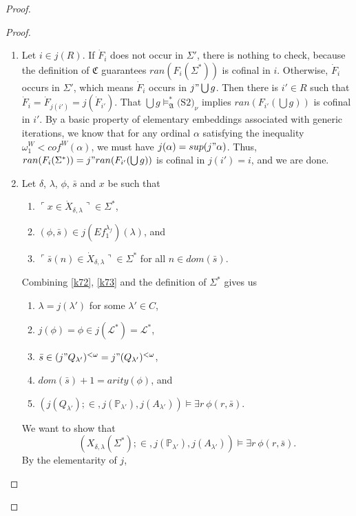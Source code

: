 \documentclass[12pt]{article}
\numberwithin{equation}{section}
\begin{document}
\begin{proof}
\begin{proof}
\begin{enumerate}[label=<$k$> $\eq$ \arabic* :, leftmargin=70pt]
    \addtocounter{enumi}{1}
    \item Let $i \in j(R)$. If $\dot{F}_i$ does not occur in $\Sigma'$, there is nothing to check, because the definition of $\mathfrak{C}$ guarantees $ran(F_i(\Sigma^*))$ is cofinal in $i$. Otherwise, $\dot{F}_i$ occurs in $\Sigma'$, which means $\dot{F}_i$ occurs in $j" \bigcup g$. Then there is $i' \in R$ such that $\dot{F}_i = \dot{F}_{j(i')} = j(\dot{F}_{i'})$. That $\bigcup g \models^*_{\mathfrak{A}} \text{(S2)}_{\nu}$ implies $ran(F_{i'}(\bigcup g))$ is cofinal in $i'$. By a basic property of elementary embeddings associated with generic iterations, we know that for any ordinal $\alpha$ satisfying the inequality $\omega_1^W < cof^{W}(\alpha)$, we must have $j(\alpha) = sup(j" \alpha)$. Thus, $ran(F_i(\Sigma^*)) = j" ran(F_{i'}(\bigcup g))$ is cofinal in $j(i') = i$, and we are done.
    \addtocounter{enumi}{4}
    \item\label{k7m} Let $\delta$, $\lambda$, $\phi$, $\bar{s}$ and $x$ be such that 
    \begin{enumerate}[label=(K7.\arabic*), leftmargin=50pt]
        \item $\ulcorner x \in \dot{X}_{\delta, \lambda} \urcorner \in \Sigma^*$,
        \item\label{k72} $(\phi, \bar{s}) \in j(Ef_1^{\lambda_f})(\lambda)$, and
        \item\label{k73} $\ulcorner \bar{s}(n) \in \dot{X}_{\delta, \lambda} \urcorner \in \Sigma^*$ for all $n \in dom(\bar{s})$.
    \end{enumerate}
    Combining \ref{k72}, \ref{k73} and the definition of $\Sigma^*$ gives us 
    \begin{enumerate}[label=(\alph*)]
        \item $\lambda = j(\lambda')$ for some $\lambda' \in C$,
        \item $j(\phi) = \phi \in j(\mathcal{L}^*) = \mathcal{L}^*$,
        \item $\bar{s} \in (j" Q_{\lambda'})^{< \omega} = j" (Q_{\lambda'})^{< \omega}$,
        \item $dom(\bar{s}) + 1 = arity(\phi)$, and
        \item $(j(Q_{\lambda'}); \in, j(\mathbb{P}_{\lambda'}), j(A_{\lambda'})) \models \exists r \ \phi(r, \bar{s})$.
    \end{enumerate}
    We want to show that $$(X_{\delta, \lambda}(\Sigma^*); \in, j(\mathbb{P}_{\lambda'}), j(A_{\lambda'})) \models \exists r \ \phi(r, \bar{s}).$$ By the elementarity of $j$, 

\end{enumerate}
\end{proof}
\end{proof}
\end{document}
